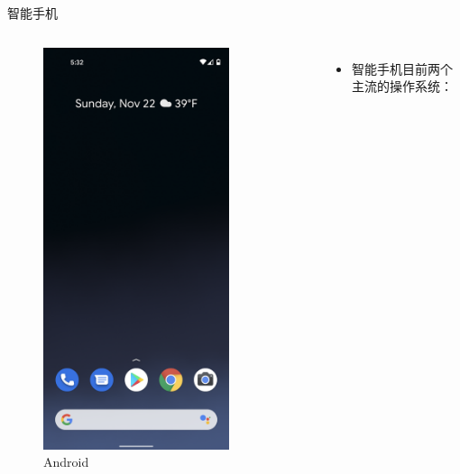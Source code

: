 \documentclass[UTF8]{ctexbeamer}
\begin{document}
\begin{frame}{智能手机}
    
    \begin{columns}
    \begin{figure}
        \centering
        \includegraphics[width=0.8\textwidth]{android.png}
        \caption{Android}
        \label{fig:android}
    \end{figure}
    \begin{itemize}
        \item 智能手机目前两个主流的操作系统：

\end{itemize}
\end{columns}
\end{frame}
\end{document}
